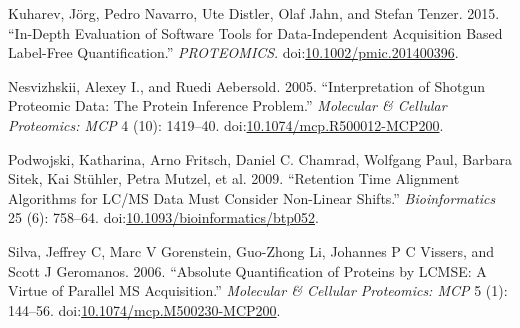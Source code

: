 \documentclass[]{article}
\begin{document}
\hypertarget{ref-kuharev_-depth_2015}{}
Kuharev, Jörg, Pedro Navarro, Ute Distler, Olaf Jahn, and Stefan Tenzer.
2015. ``In-Depth Evaluation of Software Tools for Data-Independent
Acquisition Based Label-Free Quantification.'' \emph{PROTEOMICS}.
doi:\href{https://doi.org/10.1002/pmic.201400396}{10.1002/pmic.201400396}.

\hypertarget{ref-nesvizhskii_interpretation_2005}{}
Nesvizhskii, Alexey I., and Ruedi Aebersold. 2005. ``Interpretation of
Shotgun Proteomic Data: The Protein Inference Problem.'' \emph{Molecular
\& Cellular Proteomics: MCP} 4 (10): 1419--40.
doi:\href{https://doi.org/10.1074/mcp.R500012-MCP200}{10.1074/mcp.R500012-MCP200}.

\hypertarget{ref-podwojski_retention_2009}{}
Podwojski, Katharina, Arno Fritsch, Daniel C. Chamrad, Wolfgang Paul,
Barbara Sitek, Kai Stühler, Petra Mutzel, et al. 2009. ``Retention Time
Alignment Algorithms for LC/MS Data Must Consider Non-Linear Shifts.''
\emph{Bioinformatics} 25 (6): 758--64.
doi:\href{https://doi.org/10.1093/bioinformatics/btp052}{10.1093/bioinformatics/btp052}.

\hypertarget{ref-silva_absolute_2006}{}
Silva, Jeffrey C, Marc V Gorenstein, Guo-Zhong Li, Johannes P C Vissers,
and Scott J Geromanos. 2006. ``Absolute Quantification of Proteins by
LCMSE: A Virtue of Parallel MS Acquisition.'' \emph{Molecular \&
Cellular Proteomics: MCP} 5 (1): 144--56.
doi:\href{https://doi.org/10.1074/mcp.M500230-MCP200}{10.1074/mcp.M500230-MCP200}.
\end{document}
